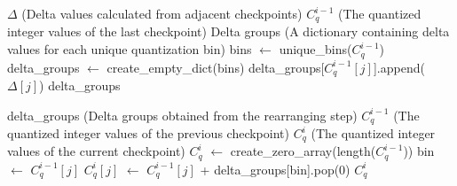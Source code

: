 \begin{algorithm}[t]
\caption{Rearranging parameters for efficient encoding}
\begin{algorithmic}[1]
\REQUIRE $\Delta$ (Delta values calculated from adjacent checkpoints)
\REQUIRE $C^{i-1}_q$ (The quantized integer values of the last checkpoint)
\ENSURE Delta groups (A dictionary containing delta values for each unique quantization bin)
\STATE bins $\leftarrow$ unique\_bins($C^{i-1}_q$)
\STATE delta\_groups $\leftarrow$ create\_empty\_dict(bins)
\STATE delta\_groups[$C^{i-1}_q[j]$].append($\Delta[j]$)
\ENDFOR
\RETURN delta\_groups
\end{algorithmic}\label{algo:param-rearrangement}
\end{algorithm}

\begin{algorithm}
\caption{Reconstructing parameters after rearrangement}
\begin{algorithmic}[1]
\REQUIRE delta\_groups (Delta groups obtained from the rearranging step)
\REQUIRE $C^{i-1}_q$ (The quantized integer values of the previous checkpoint)
\ENSURE $C^i_q$ (The quantized integer values of the current checkpoint)
\STATE $C^i_q$ $\leftarrow$ create\_zero\_array(length($C^{i-1}_q$))
\STATE bin $\leftarrow$ $C^{i-1}_q[j]$
\STATE $C^i_q[j]$ $\leftarrow$ $C^{i-1}_q[j]$ + delta\_groups[bin].pop(0)
\ENDIF
\ENDFOR
\RETURN $C^i_q$
\end{algorithmic}\label{algo:param-reconstruction}
\end{algorithm}
